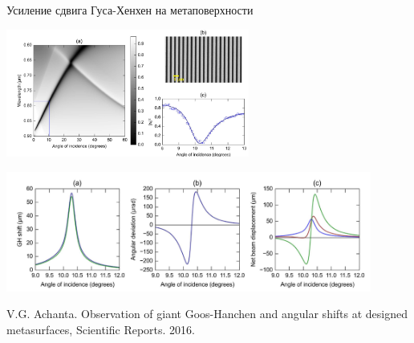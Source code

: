 \documentclass[9pt, compress, xcolor=table]{beamer}
\begin{document}
\begin{frame}{Усиление сдвига Гуса-Хенхен на метаповерхности}
\begin{center}
\includegraphics[width=0.6\textwidth]{metagh1}

\includegraphics[width=0.9\textwidth]{metagh2}
\end{center}

V.G. Achanta. Observation of giant Goos-Hanchen and angular shifts at designed metasurfaces, Scientific Reports. 2016.
\end{frame}
\end{document}
